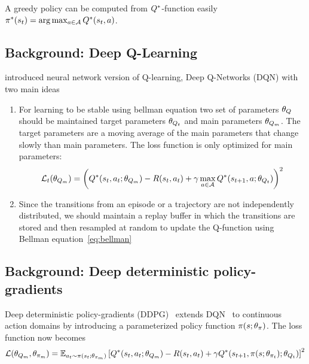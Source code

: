 A greedy policy can be computed from $Q^*$-function easily $\pi^*(s_t) = \arg \max_{a \in \mathcal{A}} Q^*(s_t, a)$.

\subsection{Background: Deep Q-Learning}

\citet{MnKaSiNATURE2015} introduced neural network version of Q-learning, Deep
Q-Networks (DQN) with
two main ideas
%
\begin{enumerate}
\item For learning to be stable using bellman equation two set of parameters
  $\theta_{Q}$ should be maintained target parameters
  $\theta_{Q_t}$ and main parameters $\theta_{Q_m}$. The
  target parameters are a moving average of the main parameters that change
  slowly than main parameters. The loss function is only optimized for main parameters:
\begin{align}
  \mathcal{L}_t(\theta_{Q_m}) = \left(
  Q^*(s_t, a_t; \theta_{Q_m}) -
  R(s_t, a_t) + \gamma \max_{a \in \mathcal{A}} Q^*(s_{t+1}, a; \theta_{Q_t}) \right)^2
                                    \label{eq:bellman-dqn}
\end{align}

\item Since the transitions from an episode or a trajectory are not
  independently distributed, we should maintain a replay buffer in which the
  transitions are stored and then resampled at random to update the Q-function
  using Bellman equation~\eqref{eq:bellman}
\end{enumerate}%
% 


\subsection{Background: Deep deterministic policy-gradients}

Deep deterministic policy-gradients (DDPG)~\citep{lillicrap2015continuous}
extends DQN~\citep{MnKaSiNATURE2015} to continuous action domains by introducing
a parameterized policy function $\pi(s; \theta_\pi)$. The loss
function now becomes
\begin{align}
  \mathcal{L}(\theta_{Q_m}, \theta_{\pi_m}) = \mathbb{E}_{a_t\sim\pi(s_t; \theta_{\pi_m})}\left[
  Q^*(s_t, a_t; \theta_{Q_m}) -
  R(s_t, a_t) + \gamma Q^*(s_{t+1}, \pi(s; \theta_{\pi_t}); \theta_{Q_t}) \right]^2 \label{eq:bellman-ddpg}
\end{align}

